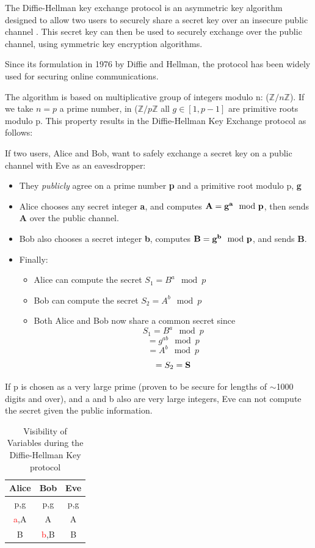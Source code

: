 \documentclass[conference]{IEEEtran}
\begin{document}
The Diffie-Hellman key exchange protocol is an asymmetric key algorithm designed to allow two users to securely share a secret key over an insecure public channel \cite{Diffie-Hellman}.
This secret key can then be used to securely exchange over the public channel, using symmetric key encryption algorithms.


Since its formulation in 1976 by Diffie and Hellman, the protocol has been widely used for securing online communications. 

The algorithm is based on multiplicative group of integers modulo n: ($\mathbb{Z}/n\mathbb{Z}$). If we take $n =p $ a prime number, in ($\mathbb{Z}/p\mathbb{Z}$ all $g \in [1,p-1]$ are primitive roots modulo p. This property results in the Diffie-Hellman Key Exchange protocol as follows:


If two users, Alice and Bob, want to safely exchange a secret key on a public channel with Eve as an eavesdropper:
\begin{itemize}
    \item They \textit{publicly} agree on a prime number \textbf{p} and a primitive root modulo p, \textbf{g}
    \item Alice chooses any secret integer \textbf{a}, and computes $\bf{A = g^a \mod{p}}$, then sends \textbf{A} over the public channel.
    \item Bob also chooses a secret integer \textbf{b}, computes $\bf{B = g^b \mod{p}}$, and sends \textbf{B}.
    \item Finally:
    \begin{itemize}
        \item Alice can compute the secret $S_1 = B^a \mod{p} $
        \item Bob can compute the secret $S_2 = A^b \mod{p} $
        \item Both Alice and Bob now share a common secret since $$S_1 = B^a \mod{p} $$
        $$= g^{ab} \mod{p} $$
        $$= A^b \mod{p}$$
        $$ = S_2 = \bf{S} $$
    \end{itemize}
\end{itemize}
If p is chosen as a very large prime (proven to be secure for lengths of $\sim$1000 digits and over), and a and b also are very large integers, Eve can not compute the secret given the public information.






\begin{table}[htp]
\centering
\large
\begin{tabular}{|c|c|c|}
\hline
\textbf{Alice} & \textbf{Bob} & \textbf{Eve} \\
\hline
  p,g & p,g & p,g  \\ 
 \textcolor{red}{a},A &  A &  A  \\ 
 B &  \textcolor{red}{b},B & B \\
 \hline
\end{tabular}
\large
\medskip
\caption{Visibility of Variables during the Diffie-Hellman Key protocol}
\label{my-label}
\end{table}
\end{document}
